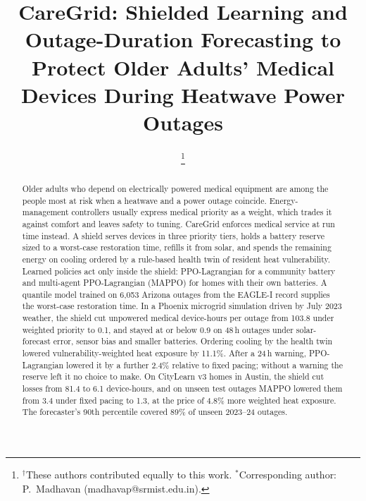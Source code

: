 \documentclass[conference]{IEEEtran}
\begin{document}

\title{CareGrid: Shielded Learning and Outage-Duration Forecasting to Protect Older Adults' Medical Devices During Heatwave Power Outages}

\author{
\thanks{$^{\dagger}$These authors contributed equally to this work. $^{*}$Corresponding author: P.~Madhavan (madhavap@srmist.edu.in).}}

\maketitle

\begin{abstract}
Older adults who depend on electrically powered medical equipment are among the people most at risk when a heatwave and a power outage coincide. Energy-management controllers usually express medical priority as a weight, which trades it against comfort and leaves safety to tuning. CareGrid enforces medical service at run time instead. A shield serves devices in three priority tiers, holds a battery reserve sized to a worst-case restoration time, refills it from solar, and spends the remaining energy on cooling ordered by a rule-based health twin of resident heat vulnerability. Learned policies act only inside the shield: PPO-Lagrangian for a community battery and multi-agent PPO-Lagrangian (MAPPO) for homes with their own batteries. A quantile model trained on 6,053 Arizona outages from the EAGLE-I record supplies the worst-case restoration time. In a Phoenix microgrid simulation driven by July 2023 weather, the shield cut unpowered medical device-hours per outage from 103.8 under weighted priority to 0.1, and stayed at or below 0.9 on 48\,h outages under solar-forecast error, sensor bias and smaller batteries. Ordering cooling by the health twin lowered vulnerability-weighted heat exposure by 11.1\%. After a 24\,h warning, PPO-Lagrangian lowered it by a further 2.4\% relative to fixed pacing; without a warning the reserve left it no choice to make. On CityLearn v3 homes in Austin, the shield cut losses from 81.4 to 6.1 device-hours, and on unseen test outages MAPPO lowered them from 3.4 under fixed pacing to 1.3, at the price of 4.8\% more weighted heat exposure. The forecaster's 90th percentile covered 89\% of unseen 2023--24 outages.
\end{abstract}
\end{document}
